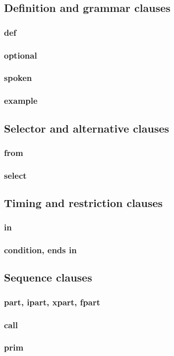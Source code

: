 \documentclass[12pt]{article}
\begin{document}
\subsection{Definition and grammar clauses}
\subsubsection{def}
\subsubsection{optional}
\subsubsection{spoken}
\subsubsection{example}

\subsection{Selector and alternative clauses}
\subsubsection{from}
\subsubsection{select}

\subsection{Timing and restriction clauses}
\subsubsection{in}
\subsubsection{condition, ends in}

\subsection{Sequence clauses}
\subsubsection{part, ipart, xpart, fpart}
\subsubsection{call}
\subsubsection{prim}
\end{document}
